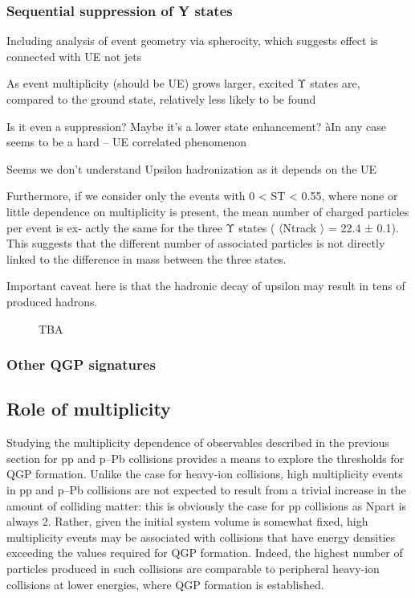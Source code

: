 \subsubsection{Sequential suppression of Y states}

Including analysis of event
geometry via spherocity, which
suggests effect is connected
with UE not jets

As event multiplicity (should be UE) grows larger, excited Υ states are,
compared to the ground state, relatively less likely to be found 

Is it even a suppression? Maybe it’s a lower state enhancement?
àIn any case seems to be a hard – UE correlated phenomenon 

Seems we don’t understand Upsilon hadronization as it depends on the UE

Furthermore, if we consider only the events with 0 < ST < 0.55, where none or little
dependence on multiplicity is present, the mean number of charged particles per event is ex-
actly the same for the three Υ states ( 〈Ntrack
〉 = 22.4 ± 0.1). This suggests that the different
number of associated particles is not directly linked to the difference in mass between the three
states.

Important caveat here is that the hadronic decay of upsilon may result in tens of produced hadrons.

\begin{figure}[H]
\caption{TBA}
\label{fig:colls:ssupsilon}
\end{figure}

\subsubsection{Other QGP signatures}

\subsection{Role of multiplicity}

Studying the multiplicity dependence of observables described in
the previous section for pp and p–Pb collisions provides a means to explore the thresholds for QGP formation. Unlike the case for heavy-ion collisions, high multiplicity events in pp and p–Pb collisions are
not expected to result from a trivial increase in the amount of colliding matter: this is obviously the case
for pp collisions as Npart is always 2. Rather, given the initial system volume is somewhat fixed, high
multiplicity events may be associated with collisions that have energy densities exceeding the values
required for QGP formation. Indeed, the highest number of particles produced in such collisions are
comparable to peripheral heavy-ion collisions at lower energies, where QGP formation is established.

